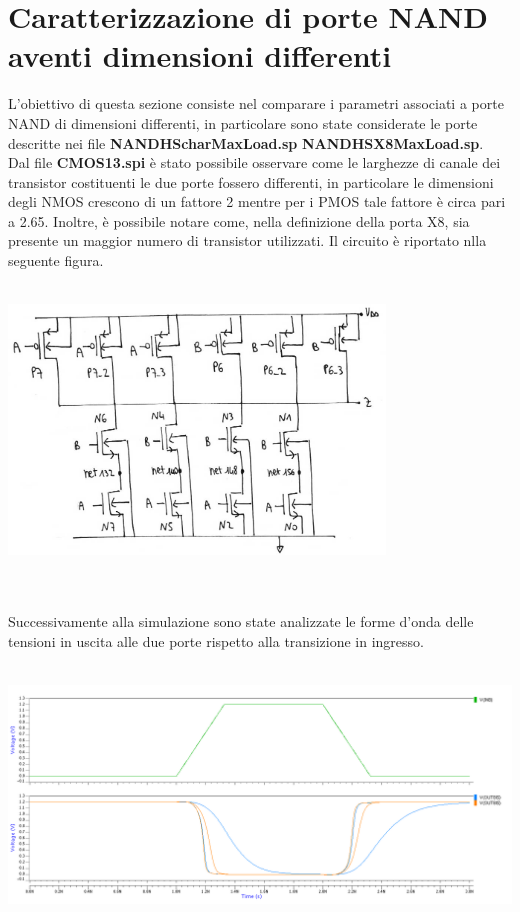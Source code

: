 \documentclass[11pt,  english, makeidx, a4paper, titlepage, oneside]{book}
\begin{document}
\section{Caratterizzazione di porte NAND aventi dimensioni differenti}
L'obiettivo di questa sezione consiste nel comparare i parametri associati a porte NAND di dimensioni differenti, in particolare sono state considerate le porte descritte nei file \textbf{NANDHScharMaxLoad.sp} \textbf{NANDHSX8MaxLoad.sp}.
\\
Dal file \textbf{CMOS13.spi} è stato possibile osservare come le larghezze di canale dei transistor costituenti le due porte fossero differenti, in particolare le dimensioni degli NMOS crescono di un fattore 2 mentre per i PMOS tale fattore è circa pari a 2.65. Inoltre, è possibile notare come, nella definizione della porta X8, sia presente un maggior numero di transistor utilizzati. Il circuito è riportato nlla seguente figura.
\\\\
\centerline{\includegraphics[width=10cm]{./img/Lab_5/X8.jpg}}
\\\\
Successivamente alla simulazione sono state analizzate le forme d'onda delle tensioni in uscita alle due porte rispetto alla transizione in ingresso.
\\\\
\centerline{\includegraphics[width=14cm]{./img/Lab_5/waveform_4.png}}
\end{document}
